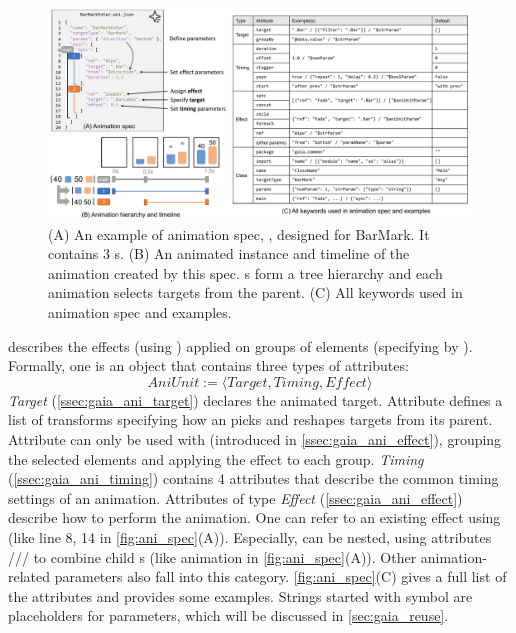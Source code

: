 \begin{figure}[h]
  \centering
  \includegraphics[width=\linewidth]{figs/ani_spec.pdf}
  \caption{
  (A) An example of \gaia{} animation spec, \ie \aniclass{}, designed for BarMark. It contains 3 \aniunit{}s. 
  (B) An animated instance and timeline of the animation created by this spec. \aniunit{}s form a tree hierarchy and each animation selects targets from the parent. 
  (C) All keywords used in \gaia{} animation spec and examples. }
  \label{fig:ani_spec}
\end{figure}

\aniunit{} describes the effects (using ) applied on groups of elements (specifying by ). 
Formally, one \aniunit{} is an object that contains three types of attributes:
$$
AniUnit := \langle Target, Timing, Effect \rangle
$$
\textit{Target} (\autoref{ssec:gaia_ani_target}) declares the animated target.
Attribute  defines a list of transforms specifying how an \aniunit{} picks and reshapes targets from its parent.
Attribute  can only be used with  (introduced in \autoref{ssec:gaia_ani_effect}), grouping the selected elements and applying the effect to each group.
\textit{Timing} (\autoref{ssec:gaia_ani_timing}) contains 4 attributes that describe the common timing settings of an animation.
Attributes of type \textit{Effect} (\autoref{ssec:gaia_ani_effect}) describe how to perform the animation.
One \aniunit{} can refer to an existing effect using  (like line 8, 14 in \autoref{fig:ani_spec}(A)).
Especially, \aniunit{} can be nested, using attributes /// to combine child \aniunit{}s (like  animation in \autoref{fig:ani_spec}(A)).
Other animation-related parameters also fall into this category.
\autoref{fig:ani_spec}(C) gives a full list of the attributes and provides some examples.
Strings started with symbol \code{\$} are placeholders for parameters, which will be discussed in \autoref{sec:gaia_reuse}.


